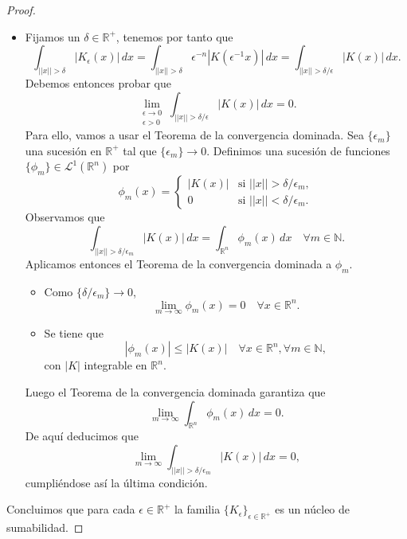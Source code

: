 \begin{proof}
\begin{itemize}
    \item Fijamos un $\delta \in \mathbb{R}^+$, tenemos por tanto que
    \begin{equation}
        \int_{||x||>\delta} |K_{\epsilon}(x)| \, dx = \int_{||x||>\delta} \epsilon^{-n}|K(\epsilon^{-1}x)| \, dx = \int_{||x||>\delta/\epsilon} |K(x)| \, dx.
    \end{equation}
    Debemos entonces probar que 
    \begin{equation}
    \lim_{\substack{\epsilon \rightarrow 0 \\ \epsilon > 0}}\int_{||x||>\delta/\epsilon} |K(x)| \, dx  = 0.
    \end{equation}
    Para ello, vamos a usar el Teorema de la convergencia dominada.
    Sea $\{\epsilon_m\}$ una sucesión en $\mathbb{R}^+$ tal que $\{\epsilon_m\} \rightarrow 0$. Definimos una sucesión de funciones $\{\phi_m\} \in \mathscr{L}^1(\mathbb{R}^n)$ por
    \begin{equation}
        \phi_m(x) = 
    \begin{cases}
    |K(x)| & \text{si } ||x|| > \delta/\epsilon_m, \\
    0 & \text{si } ||x|| < \delta/\epsilon_m.
    \end{cases}
    \end{equation}
    Observamos que 
    \begin{equation}
        \int_{||x||> \delta/\epsilon_m} |K(x)|\, dx = \int_{\mathbb{R}^n} \phi_m(x) \, dx \quad \forall m \in \mathbb{N}.
    \end{equation}
    Aplicamos entonces el Teorema de la convergencia dominada a $\phi_m$.
    \begin{itemize}
        \item Como  $\{\delta/\epsilon_m\} \rightarrow 0$,
        \begin{equation}
            \lim_{m \rightarrow \infty} \phi_m(x) = 0 \quad \forall x \in \mathbb{R}^n.
        \end{equation}
        \item Se tiene que
        \begin{equation}
            |\phi_m(x)| \leq |K(x)| \quad \forall x \in \mathbb{R}^n, \forall m \in \mathbb{N},
        \end{equation}
        con $|K|$ integrable en $\mathbb{R}^n$.
    \end{itemize}
    Luego el Teorema de la convergencia dominada garantiza que 
    \begin{equation}
        \lim_{m \rightarrow \infty} \int_{\mathbb{R}^n} \phi_m(x) \, dx =0.
    \end{equation}
    De aquí deducimos que
     \begin{equation}
    \lim_{m \rightarrow \infty }\int_{||x||>\delta/\epsilon_m} |K(x)| \, dx  = 0,
    \end{equation}
    cumpliéndose así la última condición.
    
\end{itemize}
Concluimos que para cada $ \epsilon \in \mathbb{R}^+$ la familia $\{K_{\epsilon}\}_{\epsilon \in \mathbb{R}^+}$ es un núcleo de sumabilidad.
\end{proof}



